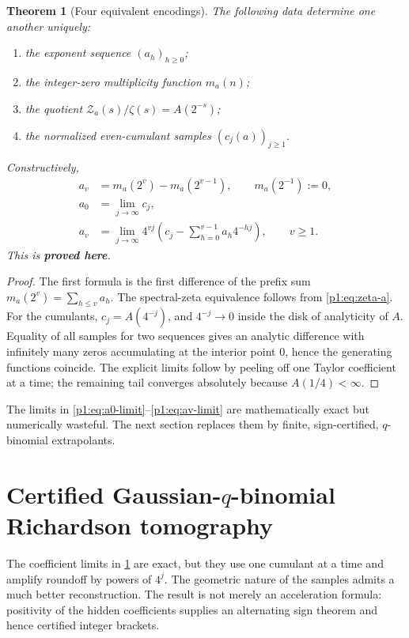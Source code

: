 \documentclass[11pt,oneside]{article}
\numberwithin{equation}{section}
\newtheorem{theorem}{Theorem}[section]
\theoremstyle{definition}
\theoremstyle{remark}
\newcommand{\statusproved}{\textcolor{deepgreen}{\textbf{proved here}}}
\newcommand{\Zspec}{\mathcal Z}
\begin{document}
\begin{theorem}[Four equivalent encodings]
\label{p1:thm:identifiability}
The following data determine one another uniquely:
\begin{enumerate}
\item the exponent sequence $(a_h)_{h\ge0}$;
\item the integer-zero multiplicity function $m_a(n)$;
\item the quotient $\Zspec_a(s)/\zeta(s)=A(2^{-s})$;
\item the normalized even-cumulant samples $(c_j(a))_{j\ge1}$.
\end{enumerate}
Constructively,
\begin{align}
 a_v&=m_a(2^v)-m_a(2^{v-1}),
 \qquad m_a(2^{-1}):=0,
 \label{p1:eq:a-from-zero}\\
 a_0&=\lim_{j\to\infty}c_j,
 \label{p1:eq:a0-limit}\\
 a_v&=\lim_{j\to\infty}4^{vj}
 \left(c_j-\sum_{h=0}^{v-1}a_h4^{-hj}\right),
 \qquad v\ge1.
 \label{p1:eq:av-limit}
\end{align}
This is \statusproved.
\end{theorem}

\begin{proof}
The first formula is the first difference of the prefix sum
$m_a(2^v)=\sum_{h\le v}a_h$.  The spectral-zeta equivalence follows from
\eqref{p1:eq:zeta-a}.  For the cumulants, $c_j=A(4^{-j})$, and
$4^{-j}\to0$ inside the disk of analyticity of $A$.  Equality of all samples for two
sequences gives an analytic difference with infinitely many zeros accumulating at the
interior point $0$, hence the generating functions coincide.  The explicit limits follow
by peeling off one Taylor coefficient at a time; the remaining tail converges absolutely
because $A(1/4)<\infty$.
\end{proof}

\begin{remark}
The limits in \eqref{p1:eq:a0-limit}--\eqref{p1:eq:av-limit} are mathematically exact but
numerically wasteful.  The next section replaces them by finite, sign-certified,
$q$-binomial extrapolants.
\end{remark}

\section{Certified Gaussian-$q$-binomial Richardson tomography}
\label{p1:sec:tomography}

The coefficient limits in \cref{p1:thm:identifiability} are exact, but they use one cumulant at
a time and amplify roundoff by powers of $4^j$.  The geometric nature of the samples admits
a much better reconstruction.  The result is not merely an acceleration formula: positivity
of the hidden coefficients supplies an alternating sign theorem and hence certified integer
brackets.
\end{document}
